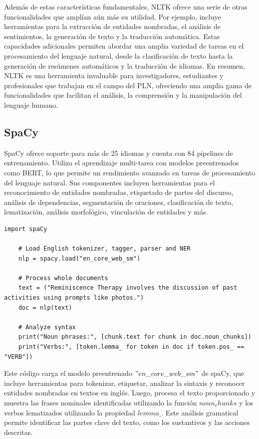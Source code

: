 Además de estas características fundamentales, NLTK ofrece una serie de otras funcionalidades que amplían aún más su utilidad. Por ejemplo, incluye herramientas para la extracción de entidades nombradas, el análisis de sentimientos, la generación de texto y la traducción automática. Estas capacidades adicionales permiten abordar una amplia variedad de tareas en el procesamiento del lenguaje natural, desde la clasificación de texto hasta la generación de resúmenes automáticos y la traducción de idiomas. En resumen, NLTK es una herramienta invaluable para investigadores, estudiantes y profesionales que trabajan en el campo del PLN, ofreciendo una amplia gama de funcionalidades que facilitan el análisis, la comprensión y la manipulación del lenguaje humano.


\subsection{SpaCy}


SpaCy ofrece soporte para más de 25 idiomas y cuenta con 84 pipelines de entrenamiento. Utiliza el aprendizaje multi-tarea con modelos preentrenados como BERT, lo que permite un rendimiento avanzado en tareas de procesamiento del lenguaje natural. Sus componentes incluyen herramientas para el reconocimiento de entidades nombradas, etiquetado de partes del discurso, análisis de dependencias, segmentación de oraciones, clasificación de texto, lematización, análisis morfológico, vinculación de entidades y más.

\begin{lstlisting}[style=SpyderStyle, caption={Ejemplo de tokenización usando spaCy}, captionpos=b, label={lst:python},breaklines = true]
	import spaCy
	
	# Load English tokenizer, tagger, parser and NER
	nlp = spacy.load("en_core_web_sm")
	
	# Process whole documents
	text = ("Reminiscence Therapy involves the discussion of past activities using prompts like photos.")
	doc = nlp(text)
	
	# Analyze syntax
	print("Noun phrases:", [chunk.text for chunk in doc.noun_chunks])
	print("Verbs:", [token.lemma_ for token in doc if token.pos_ == "VERB"])
\end{lstlisting}

Este código carga el modelo preentrenado $"en\_core\_web\_sm"$ de spaCy, que incluye herramientas para tokenizar, etiquetar, analizar la sintaxis y reconocer entidades nombradas en textos en inglés. Luego, procesa el texto proporcionado y muestra las frases nominales identificadas utilizando la función $noun_chunks$ y los verbos lematizados utilizando la propiedad $lemma\_$. Este análisis gramatical permite identificar las partes clave del texto, como los sustantivos y las acciones descritas.

